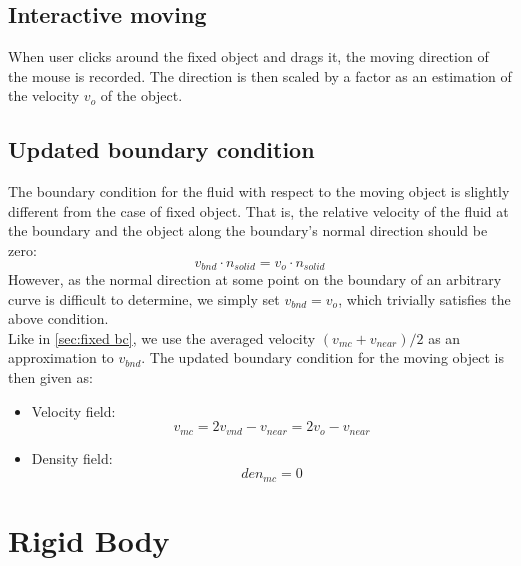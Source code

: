 \subsection{Interactive moving}
When user clicks around the fixed object and drags it, the moving direction of the mouse is recorded. The direction is then scaled by a factor as an estimation of the velocity $v_o$ of the object.
\subsection{Updated boundary condition}
\label{sec:updated bc}
The boundary condition for the fluid with respect to the moving object is slightly different from the case of fixed object. That is, the relative velocity of the fluid at the boundary and the object along the boundary's normal direction should be zero:
\begin{equation*}
    v_{bnd}\cdot n_{solid}=v_{o}\cdot n_{solid}
\end{equation*}
However, as the normal direction at some point on the boundary of an arbitrary curve is difficult to determine, we simply set $v_{bnd}=v_{o}$, which trivially satisfies the above condition. \\
Like in \autoref{sec:fixed bc}, we use the averaged velocity $(v_{mc}+v_{near})/2$ as an approximation to $v_{bnd}$. The updated boundary condition for the moving object is then given as:
\begin{itemize}
    \item Velocity field:
    \begin{equation*}
        v_{mc}=2v_{vnd}-v_{near}=2v_{o}-v_{near}
    \end{equation*}
    \item Density field:
    \begin{equation*}
        den_{mc}=0
    \end{equation*}
\end{itemize}

\section{Rigid Body}

